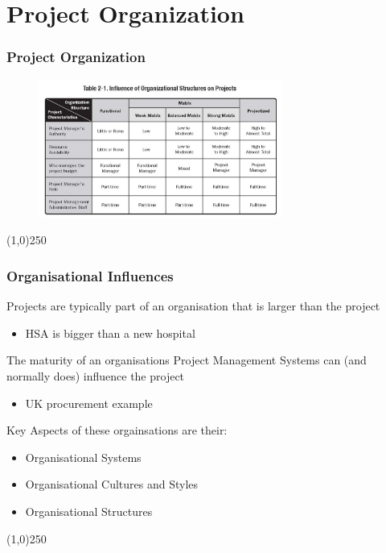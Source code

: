 \section{Project Organization}


\begin{frame}
\frametitle{Project Organization}
 \begin{figure}
 	\centering
 		\includegraphics[width = 8cm]{images/tbl2-1.jpg}
 	\label{tbl:2-1}
 \end{figure}
\end{frame}
\begin{center}\line(1,0){250}\end{center}



\begin{frame}
\frametitle{Organisational Influences}
Projects are typically part of an organisation that is larger than the project\\
\begin{itemize}
	\item HSA is bigger than a new hospital
\end{itemize}
The maturity of an organisations Project Management Systems can (and normally does) influence the project\\
\begin{itemize}
	\item UK procurement example
\end{itemize}
Key Aspects of these orgainsations are their:\\
	\begin{itemize}
		\item Organisational Systems
		\item Organisational Cultures and Styles
		\item Organisational Structures
	\end{itemize}
\end{frame}
\begin{center}\line(1,0){250}\end{center}



